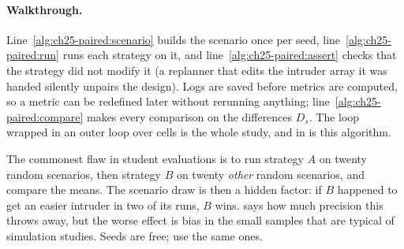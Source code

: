\begin{algorithm}[htb]
\caption{Paired evaluation of a set of strategies on one cell}
\label{alg:ch25-paired}
\end{algorithm}

\paragraph{Walkthrough.}
Line~\ref{alg:ch25-paired:scenario} builds the scenario once per seed,
line~\ref{alg:ch25-paired:run} runs each strategy on it, and
line~\ref{alg:ch25-paired:assert} checks that the strategy did not modify
it (a replanner that edits the intruder array it was handed silently unpairs
the design). Logs are saved before metrics are computed, so a metric can be
redefined later without rerunning anything;
line~\ref{alg:ch25-paired:compare} makes every comparison on the
differences $D_s$. The loop wrapped in an outer loop over cells is the whole
study, and  in  is this
algorithm.

\begin{pitfall}
The commonest flaw in student evaluations is to run strategy $A$ on twenty
random scenarios, then strategy $B$ on twenty \emph{other} random
scenarios, and compare the means. The scenario draw is then a hidden
factor: if $B$ happened to get an easier intruder in two of its runs, $B$
wins.  says how much precision this throws away,
but the worse effect is bias in the small samples that are typical of
simulation studies. Seeds are free; use the same ones.
\end{pitfall}


